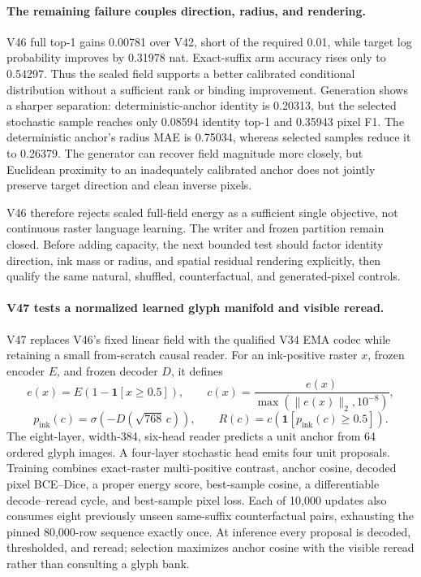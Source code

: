 \documentclass[11pt]{article}
\begin{document}
\paragraph{The remaining failure couples direction, radius, and rendering.}
V46 full top-1 gains 0.00781 over V42, short of the required 0.01, while target
log probability improves by 0.31978 nat. Exact-suffix arm accuracy rises only
to 0.54297. Thus the scaled field supports a better calibrated conditional
distribution without a sufficient rank or binding improvement. Generation
shows a sharper separation: deterministic-anchor identity is 0.20313, but the
selected stochastic sample reaches only 0.08594 identity top-1 and 0.35943
pixel F1. The deterministic anchor's radius MAE is 0.75034, whereas selected
samples reduce it to 0.26379. The generator can recover field magnitude more
closely, but Euclidean proximity to an inadequately calibrated anchor does not
jointly preserve target direction and clean inverse pixels.

V46 therefore rejects scaled full-field energy as a sufficient single
objective, not continuous raster language learning. The writer and frozen
partition remain closed. Before adding capacity, the next bounded test should
factor identity direction, ink mass or radius, and spatial residual rendering
explicitly, then qualify the same natural, shuffled, counterfactual, and
generated-pixel controls.

\paragraph{V47 tests a normalized learned glyph manifold and visible reread.}
V47 replaces V46's fixed linear field with the qualified V34 EMA codec while
retaining a small from-scratch causal reader. For an ink-positive raster $x$,
frozen encoder $E$, and frozen decoder $D$, it defines
\[
e(x)=E\!\left(1-\mathbf 1[x\geq0.5]\right),\qquad
c(x)=\frac{e(x)}{\max(\lVert e(x)\rVert_2,10^{-8})},
\]
\[
p_{\mathrm{ink}}(c)=\sigma\!\left(-D(\sqrt{768}\,c)\right),\qquad
R(c)=c\!\left(\mathbf 1[p_{\mathrm{ink}}(c)\geq0.5]\right).
\]
The eight-layer, width-384, six-head reader predicts a unit anchor from 64
ordered glyph images. A four-layer stochastic head emits four unit proposals.
Training combines exact-raster multi-positive contrast, anchor cosine, decoded
pixel BCE--Dice, a proper energy score, best-sample cosine, a differentiable
decode--reread cycle, and best-sample pixel loss. Each of 10,000 updates also
consumes eight previously unseen same-suffix counterfactual pairs, exhausting
the pinned 80,000-row sequence exactly once. At inference every proposal is
decoded, thresholded, and reread; selection maximizes anchor cosine with the
visible reread rather than consulting a glyph bank.
\end{document}
